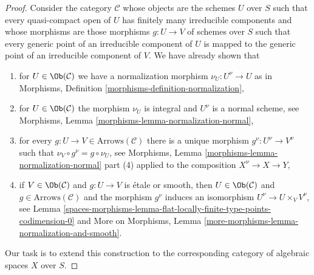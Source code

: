 \begin{proof}
Consider the category $\mathcal{C}$ whose objects are the
schemes $U$ over $S$ such that every quasi-compact open of
$U$ has finitely many irreducible components and whose morphisms
are those morphisms $g : U \to V$ of schemes over $S$ such
that every generic point of an irreducible component of $U$
is mapped to the generic point of an irreducible component of $V$.
We have already shown that
\begin{enumerate}
\item[(a)] for $U \in \Ob(\mathcal{C})$ we have a
normalization morphism $\nu_U : U^\nu \to U$ as in
Morphisms, Definition \ref{morphisms-definition-normalization},
\item[(b)] for $U \in \Ob(\mathcal{C})$ the morphism $\nu_U$
is integral and $U^\nu$ is a normal scheme, see
Morphisms, Lemma \ref{morphisms-lemma-normalization-normal},
\item[(c)] for every $g : U \to V \in \text{Arrows}(\mathcal{C})$
there is a unique morphism $g^\nu : U^\nu \to V^\nu$
such that $\nu_V \circ g^\nu = g \circ \nu_U$, see
Morphisms, Lemma \ref{morphisms-lemma-normalization-normal}
part (4) applied to the composition $X^\nu \to X \to Y$,
\item[(d)] if $V \in \Ob(\mathcal{C})$ and $g : U \to V$ is
\'etale or smooth, then $U \in \Ob(\mathcal{C})$ and
$g \in \text{Arrows}(\mathcal{C})$ and the morphism $g^\nu$
induces an isomorphism $U^\nu \to U \times_V V^\nu$, see
Lemma \ref{spaces-morphisms-lemma-flat-locally-finite-type-points-codimension-0}
and More on Morphisms, Lemma
\ref{more-morphisms-lemma-normalization-and-smooth}.
\end{enumerate}
Our task is to extend this construction to the corresponding
category of algebraic spaces $X$ over $S$.


\end{proof}
